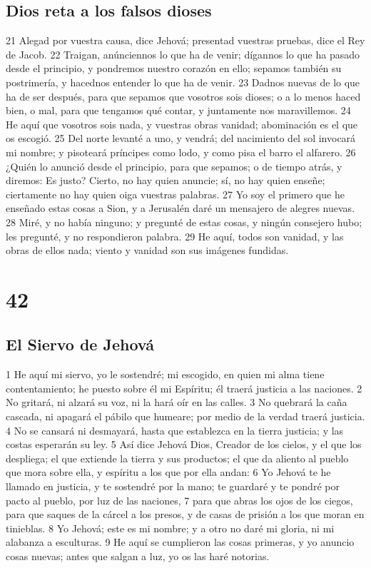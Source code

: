 \section*{Dios reta a los falsos dioses}

21 Alegad por vuestra causa, dice Jehová; presentad vuestras pruebas, dice el Rey de Jacob.
22 Traigan, anúnciennos lo que ha de venir; dígannos lo que ha pasado desde el principio, y pondremos nuestro corazón en ello; sepamos también su postrimería, y hacednos entender lo que ha de venir.
23 Dadnos nuevas de lo que ha de ser después, para que sepamos que vosotros sois dioses; o a lo menos haced bien, o mal, para que tengamos qué contar, y juntamente nos maravillemos.
24 He aquí que vosotros sois nada, y vuestras obras vanidad; abominación es el que os escogió.
25 Del norte levanté a uno, y vendrá; del nacimiento del sol invocará mi nombre; y pisoteará príncipes como lodo, y como pisa el barro el alfarero.
26 ¿Quién lo anunció desde el principio, para que sepamos; o de tiempo atrás, y diremos: Es justo? Cierto, no hay quien anuncie; sí, no hay quien enseñe; ciertamente no hay quien oiga vuestras palabras.
27 Yo soy el primero que he enseñado estas cosas a Sion, y a Jerusalén daré un mensajero de alegres nuevas.
28 Miré, y no había ninguno; y pregunté de estas cosas, y ningún consejero hubo; les pregunté, y no respondieron palabra.
29 He aquí, todos son vanidad, y las obras de ellos nada; viento y vanidad son sus imágenes fundidas.

\chapter{42}

\section*{El Siervo de Jehová}

1 He aquí mi siervo, yo le sostendré; mi escogido, en quien mi alma tiene contentamiento; he puesto sobre él mi Espíritu; él traerá justicia a las naciones. 
2 No gritará, ni alzará su voz, ni la hará oír en las calles.
3 No quebrará la caña cascada, ni apagará el pábilo que humeare; por medio de la verdad traerá justicia.
4 No se cansará ni desmayará, hasta que establezca en la tierra justicia; y las costas esperarán su ley.
5 Así dice Jehová Dios, Creador de los cielos, y el que los despliega; el que extiende la tierra y sus productos; el que da aliento al pueblo que mora sobre ella, y espíritu a los que por ella andan:
6 Yo Jehová te he llamado en justicia, y te sostendré por la mano; te guardaré y te pondré por pacto al pueblo, por luz de las naciones, 
7 para que abras los ojos de los ciegos, para que saques de la cárcel a los presos, y de casas de prisión a los que moran en tinieblas.
8 Yo Jehová; este es mi nombre; y a otro no daré mi gloria, ni mi alabanza a esculturas.
9 He aquí se cumplieron las cosas primeras, y yo anuncio cosas nuevas; antes que salgan a luz, yo os las haré notorias.


